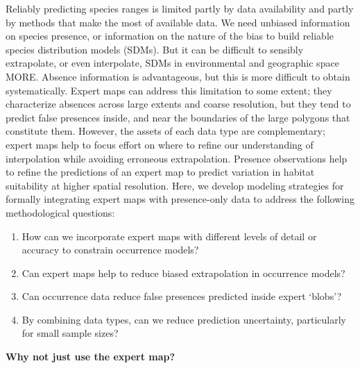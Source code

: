 Reliably predicting species ranges is limited partly by data availability and partly by methods that make the most of available data. We need unbiased information on species presence, or information on the nature of the bias to build reliable species distribution models (SDMs). But it can be difficult to sensibly extrapolate, or even interpolate, SDMs in environmental and geographic space \cite{Merow:2014hw} MORE.  Absence information is advantageous, but this is more difficult to obtain systematically. Expert maps can address this limitation to some extent; they characterize absences across large extents and coarse resolution, but they tend to predict false presences inside, and near the boundaries of the large polygons that constitute them. However, the assets of each data type are complementary; expert maps help to focus effort on where to refine our understanding of interpolation while avoiding erroneous extrapolation. Presence observations help to refine the predictions of an expert map to predict variation in habitat suitability at higher spatial resolution. Here, we develop modeling strategies for formally integrating expert maps with presence-only data to address the following methodological questions:
\begin{enumerate}
  \item How can we incorporate expert maps with different levels of detail or accuracy to constrain occurrence models? 
  \item Can expert maps help to reduce biased extrapolation in occurrence models?
  \item Can occurrence data reduce false presences predicted inside expert `blobs'?
  \item By combining data types, can we reduce prediction uncertainty, particularly for small sample sizes?
\end{enumerate}


\textbf{Why not just use the expert map?} 

